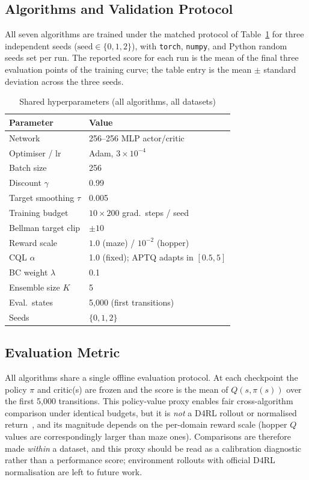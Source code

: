 \documentclass[conference]{IEEEtran}
\begin{document}
\subsection{Algorithms and Validation Protocol}

All seven algorithms are trained under the matched protocol of
Table~\ref{tab:hparams} for three independent seeds
($\mathrm{seed}\in\{0,1,2\}$), with \texttt{torch}, \texttt{numpy}, and
Python random seeds set per run. The reported score for each run is the mean
of the final three evaluation points of the training curve; the table entry
is the mean $\pm$ standard deviation across the three seeds.

\begin{table}[t]
\centering
\caption{Shared hyperparameters (all algorithms, all datasets)}
\label{tab:hparams}
\setlength{\tabcolsep}{4pt}
\begin{tabular}{ll}
\toprule
\textbf{Parameter} & \textbf{Value} \\
\midrule
Network & 256--256 MLP actor/critic \\
Optimiser / lr & Adam, $3{\times}10^{-4}$ \\
Batch size & 256 \\
Discount $\gamma$ & 0.99 \\
Target smoothing $\tau$ & 0.005 \\
Training budget & $10 \times 200$ grad.\ steps / seed \\
Bellman target clip & $\pm 10$ \\
Reward scale & $1.0$ (maze) / $10^{-2}$ (hopper) \\
CQL $\alpha$ & 1.0 (fixed); APTQ adapts in $[0.5,5]$ \\
BC weight $\lambda$ & 0.1 \\
Ensemble size $K$ & 5 \\
Eval.\ states & 5{,}000 (first transitions) \\
Seeds & $\{0,1,2\}$ \\
\bottomrule
\end{tabular}
\end{table}

\subsection{Evaluation Metric}

All algorithms share a single offline evaluation protocol. At each
checkpoint the policy $\pi$ and critic(s) are frozen and the score is the
mean of $Q(s,\pi(s))$ over the first 5{,}000 transitions. This policy-value
proxy enables fair cross-algorithm comparison under identical budgets, but
it is \emph{not} a D4RL rollout or normalised return~\cite{fu2020d4rl}, and
its magnitude depends on the per-domain reward scale (hopper $Q$ values are
correspondingly larger than maze ones). Comparisons are therefore made
\emph{within} a dataset, and this proxy should be read as a calibration
diagnostic rather than a performance score; environment rollouts with
official D4RL normalisation are left to future work.
\end{document}
